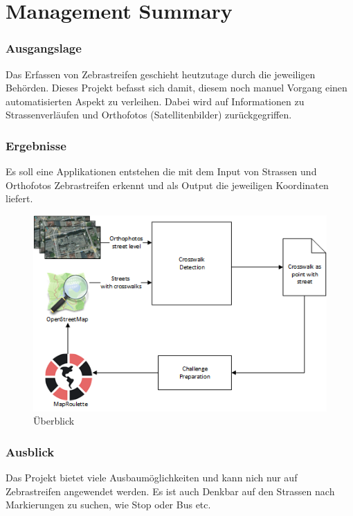 \chapter*{Management Summary}
\subsection*{Ausgangslage}
Das Erfassen von Zebrastreifen geschieht heutzutage durch die jeweiligen Behörden.
Dieses Projekt befasst sich damit, diesem noch manuel Vorgang einen automatisierten Aspekt zu verleihen.
Dabei wird auf Informationen zu Strassenverläufen und Orthofotos (Satellitenbilder) zurückgegriffen. 
\subsection*{Ergebnisse}
Es soll eine Applikationen entstehen die mit dem Input von Strassen und Orthofotos Zebrastreifen erkennt und als Output die jeweiligen Koordinaten liefert.
\\
\begin{figure}[ht]
\includegraphics[width=\textwidth]{images/management_summary_1.png}
\caption[Überblick]{Überblick}
\end{figure}
\subsection*{Ausblick}
Das Projekt bietet viele Ausbaumöglichkeiten und kann nich nur auf Zebrastreifen angewendet werden. Es ist auch Denkbar auf den Strassen nach Markierungen zu suchen, wie Stop oder Bus etc.